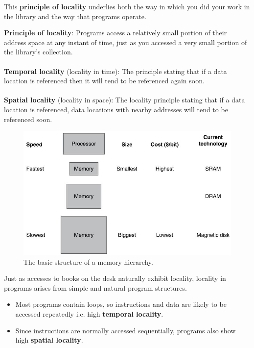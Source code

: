 \documentclass[10pt,a4paper]{article}
\begin{document}
This \textbf{principle of locality} underlies both the way in which you did your work in the library
and the way that programs operate. 

\begin{tcolorbox}[breakable,colback=white]
\textbf{Principle of locality}: Programs access a relatively small portion of their address space at
any instant of time, just as you accessed a very small portion of the library’s collection.
\\
\\
\textbf{Temporal locality} (locality in time): The principle stating that if a data location is
referenced then it will tend to be referenced again soon.
\\
\\
\textbf{Spatial  locality} (locality  in  space): The locality principle stating that if a data location is
referenced, data locations with nearby addresses will tend to be referenced soon.
\end{tcolorbox}

\pagebreak

\begin{figure} [h!]
    \centering
    \includegraphics[scale=0.6]{Mem.JPG}
    \caption{The basic structure of a memory hierarchy.}
\end{figure}

Just as accesses to books on the desk naturally exhibit locality, locality in programs arises from
simple and natural program structures. 
\begin{itemize}
    \item Most programs contain loops, so instructions and data are likely to be accessed repeatedly i.e. high \textbf{temporal locality}.
    \item Since instructions are normally accessed sequentially, programs also show high \textbf{spatial locality}.
\end{itemize} 
\end{document}
